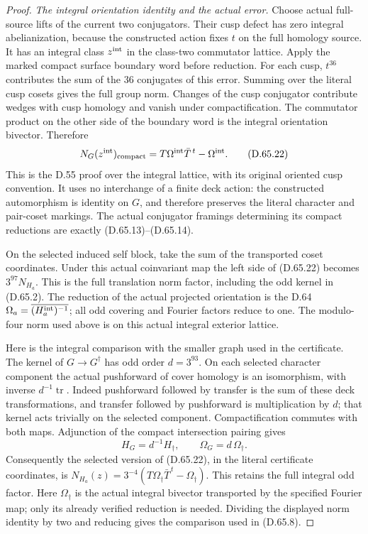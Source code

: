 \begin{proof}
\emph{The integral orientation identity and the actual error.}
Choose actual full-source lifts of the current two conjugators.
Their cusp defect has zero integral abelianization, because the
constructed action fixes \(t\) on the full homology source. It has
an integral class \(z^{\rm int}\) in the class-two commutator lattice.
Apply the marked compact surface boundary word before reduction.
For each cusp, \(t^{36}\) contributes the sum of the 36 conjugates
of this error. Summing over the literal cusp cosets gives the full
group norm. Changes of the cusp conjugator contribute wedges with
cusp homology and vanish under compactification. The commutator
product on the other side of the boundary word is the integral
orientation bivector. Therefore
\[
          N_G(z^{\rm int})_{\rm compact}
             =T\Omega^{\rm int}\bar T^{\,t}-\Omega^{\rm int}.
 \tag{D.65.22}
\]
This is the D.55 proof over the integral lattice, with its original
oriented cusp convention. It uses no interchange of a finite deck
action: the constructed automorphism is identity on \(G\), and
therefore preserves the literal character and pair-coset markings.
The actual conjugator framings determining its compact reductions
are exactly (D.65.13)--(D.65.14).

On the selected induced self block, take the sum of the transported
coset coordinates. Under this actual coinvariant map the left side
of (D.65.22) becomes \(3^{97}N_{H_a}\). This is the full translation
norm factor, including the odd kernel in (D.65.2). The reduction of
the actual projected orientation is the D.64
\(\Omega_a=\overline{(H_a^{\rm int})^{-1}}\); all odd covering and
Fourier factors reduce to one. The modulo-four norm used above is
on this actual integral exterior lattice.

Here is the integral comparison with the smaller graph used in the
certificate. The kernel of \(G\to G^\dagger\) has odd order
\(d=3^{93}\). On each selected character component the actual
pushforward of cover homology is an isomorphism, with inverse
\(d^{-1}\operatorname{tr}\). Indeed pushforward followed by transfer
is the sum of these deck transformations, and transfer followed by
pushforward is multiplication by \(d\); that kernel acts trivially
on the selected component. Compactification commutes with both
maps. Adjunction of the compact intersection pairing gives
\[
 H_G=d^{-1}H_{\dagger},\qquad
 \Omega_G=d\,\Omega_{\dagger}.
 \tag{D.65.23}
\]
Consequently the selected version of (D.65.22), in the literal
certificate coordinates, is
\(N_{H_a}(z)=3^{-4}(T\Omega_{\dagger}\bar T^{\,t}
-\Omega_{\dagger})\). This retains the full integral odd factor.
Here \(\Omega_{\dagger}\) is the actual integral bivector transported
by the specified Fourier map; only its already verified reduction
is needed. Dividing the displayed norm identity by two and reducing
gives the comparison used in (D.65.8).


\end{proof}
